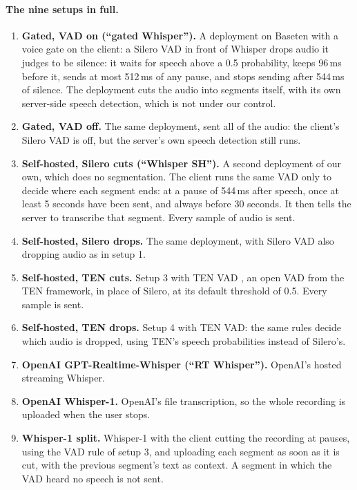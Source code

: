 \documentclass[11pt]{article}
\begin{document}
\paragraph{The nine setups in full.}
\begin{enumerate}\itemsep1pt
  \item \textbf{Gated, VAD on (``gated Whisper'').} A deployment on Baseten with a voice gate on the client: a Silero VAD in front of Whisper drops audio it judges to be silence: it waits for speech above a 0.5 probability, keeps 96\,ms before it, sends at most 512\,ms of any pause, and stops sending after 544\,ms of silence. The deployment cuts the audio into segments itself, with its own server-side speech detection, which is not under our control.
  \item \textbf{Gated, VAD off.} The same deployment, sent all of the audio: the client's Silero VAD is off, but the server's own speech detection still runs.
  \item \textbf{Self-hosted, Silero cuts (``Whisper SH'').} A second deployment of our own, which does no segmentation. The client runs the same VAD only to decide where each segment ends: at a pause of 544\,ms after speech, once at least 5 seconds have been sent, and always before 30 seconds. It then tells the server to transcribe that segment. Every sample of audio is sent.
  \item \textbf{Self-hosted, Silero drops.} The same deployment, with Silero VAD also dropping audio as in setup 1.
  \item \textbf{Self-hosted, TEN cuts.} Setup 3 with TEN VAD \citep{tenvad}, an open VAD from the TEN framework, in place of Silero, at its default threshold of 0.5. Every sample is sent.
  \item \textbf{Self-hosted, TEN drops.} Setup 4 with TEN VAD: the same rules decide which audio is dropped, using TEN's speech probabilities instead of Silero's.
  \item \textbf{OpenAI GPT-Realtime-Whisper (``RT Whisper'').} OpenAI's hosted streaming Whisper.
  \item \textbf{OpenAI Whisper-1.} OpenAI's file transcription, so the whole recording is uploaded when the user stops.
  \item \textbf{Whisper-1 split.} Whisper-1 with the client cutting the recording at pauses, using the VAD rule of setup 3, and uploading each segment as soon as it is cut, with the previous segment's text as context. A segment in which the VAD heard no speech is not sent.
\end{enumerate}
\end{document}
